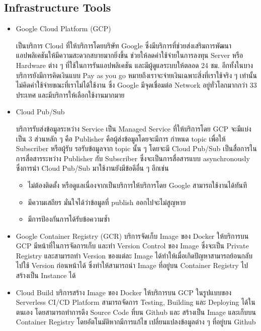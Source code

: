 \documentclass[12pt,oneside,openright,a4paper]{cpe-thai-project}
\begin{document}
  \subsection{Infrastructure Tools}
    \begin{itemize}
      \item Google Cloud Platform (GCP)
      
      \hspace{1cm}เป็นบริการ Cloud ที่ให้บริการโดยบริษัท Google ซึ่งมีบริการที่ช่วยส่งเสริมการพัฒนาแอปพลิเคชันให้มีความสะดวกสบายมากยิ่งขึ้น 
      ช่วยให้ลดค่าใช้จ่ายในการลงทุน Server หรือ Hardware ต่าง ๆ ที่ใช้ในการรันแอปพลิเคชัน และมีผู้ดูแลระบบให้ตลอด 24 ชม. อีกทั้งในบางบริการยังมีการคิดเงินแบบ Pay as you go 
      หมายถึงเราจะจ่ายเงินเฉพาะสิ่งที่เราใช้จริง ๆ เท่านั้น ไม่คิดค่าใช้จ่ายขณะที่เราไม่ได้ใช้งาน ซึ่ง Google มีจุดเชื่อมต่อ Network อยู่ทั่วโลกมากกว่า 33 ประเทศ และมีบริการให้เลือกใช้งานมากมาย \cite{gcp}

      \item Cloud Pub/Sub
      
      \hspace{1cm}บริการรับส่งข้อมูลระหว่าง Service เป็น Managed Service ที่ให้บริการโดย GCP จะมีแบ่งเป็น 3 ส่วนหลัก ๆ 
      คือ Publisher คือผู้ส่งข้อมูลโดยจะมีการ กำหนด topic เพื่อให้ Subscriber หรือผู้รับ รอรับข้อมูลจาก topic นั้น ๆ 
      โดยจะมี Cloud Pub/Sub เป็นสื่อการในการสื่อสารระหว่าง Publisher กับ Subscriber ซึ่งจะเป็นการสื่อสารแบบ asynchronously \cite{pubsub} 
      ซึ่งการนำ Cloud Pub/Sub มาใช้งานยังมีข้อดีอื่น ๆ อีกเช่น
      \begin{itemize}
        \item ไม่ต้องติดตั้ง หรือดูแลเนื่องจากเป็นบริการให้บริการโดย Google สามารถใช้งานได้ทันที
        \item มีความเสถียร มั่นใจได้ว่าข้อมูลที่ publish ออกไปจะไม่สูญหาย
        \item มีการป้องกันการได้รับข้อความซ้ำ
      \end{itemize}

      \item Google Container Registry (GCR)
      \hspace{1cm}บริการจัดเก็บ Image ของ Docker ให้บริการบน GCP มีหน้าที่ในการจัดการเก็บ และทำ Version Control ของ Image 
      ซึ่งจะเป็น Private Registry และสามารถทำ Version ของแต่ละ Image ได้ทำให้เมื่อเกิดปัญหาสามารถย้อนกลับไปใช้ Version ก่อนหน้าได้ 
      ซึ่งทำให้สามารถนำ Image ที่อยู่บน Container Registry ไปสร้างเป็น Instance ได้ \cite{GCR}
      
      \item Cloud Build
      \hspace{1cm}บริการสร้าง Image ของ Docker ให้บริการบน GCP ในรูปแบบของ Serverless CI/CD Platform 
      สามารถจัดการ Testing, Building และ Deploying ได้ในตนเอง โดยสามารถทำการดึง Source Code ที่บน Github และ สร้างเป็น Image 
      และเก็บบน Container Registry โดยอัตโนมัติหากมีการแก้ไข เปลี่ยนแปลงข้อมูลต่าง ๆ ที่อยู่บน Github \cite{cloud_build}


\end{itemize}
\end{document}
